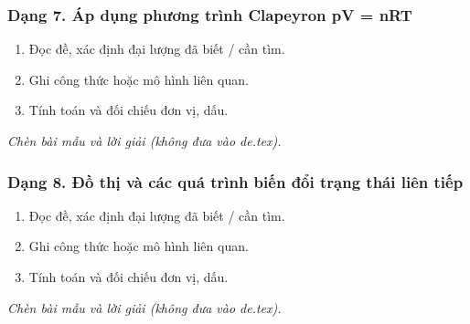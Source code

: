 \subsubsection{Dạng 7. Áp dụng phương trình Clapeyron pV = nRT}
\begin{phuongphap}
\begin{enumerate}
\item Đọc đề, xác định đại lượng đã biết / cần tìm.
\item Ghi công thức hoặc mô hình liên quan.
\item Tính toán và đối chiếu đơn vị, dấu.
\end{enumerate}
\end{phuongphap}
\begin{vidumau}
\textit{Chèn bài mẫu và lời giải (không đưa vào de.tex).}
\end{vidumau}

\subsubsection{Dạng 8. Đồ thị và các quá trình biến đổi trạng thái liên tiếp}
\begin{phuongphap}
\begin{enumerate}
\item Đọc đề, xác định đại lượng đã biết / cần tìm.
\item Ghi công thức hoặc mô hình liên quan.
\item Tính toán và đối chiếu đơn vị, dấu.
\end{enumerate}
\end{phuongphap}
\begin{vidumau}
\textit{Chèn bài mẫu và lời giải (không đưa vào de.tex).}
\end{vidumau}

